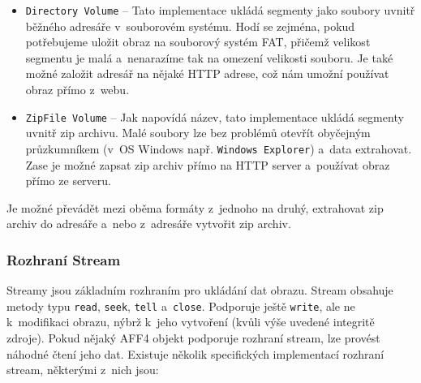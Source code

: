 \begin{itemize}
\item \texttt{Directory Volume} -- Tato implementace ukládá segmenty jako soubory uvnitř běžného adresáře v~souborovém systému. Hodí se zejména, pokud potřebujeme uložit obraz na souborový systém FAT, přičemž velikost segmentu je malá a~nenarazíme tak na omezení velikosti souboru. Je také možné založit adresář na nějaké HTTP adrese, což nám umožní používat obraz přímo z~webu.

\item \texttt{ZipFile Volume} -- Jak napovídá název, tato implementace ukládá segmenty uvnitř zip archivu. Malé soubory lze bez problémů otevřít obyčejným průzkumníkem (v~OS Windows např. \texttt{Windows Explorer}) a~data extrahovat. Zase je možné zapsat zip archiv přímo na HTTP server a~používat obraz přímo ze serveru.
\end{itemize}

\noindent Je možné převádět mezi oběma formáty z~jednoho na druhý, extrahovat zip archiv do adresáře a~nebo z~adresáře vytvořit zip archiv.

\subsubsection{Rozhraní Stream}
Streamy jsou základním rozhraním pro ukládání dat obrazu. Stream obsahuje metody typu \texttt{read}, \texttt{seek}, \texttt{tell} a~\texttt{close}. Podporuje ještě \texttt{write}, ale ne k~modifikaci obrazu, nýbrž k~jeho vytvoření (kvůli výše uvedené integritě zdroje). Pokud nějaký AFF4 objekt podporuje rozhraní stream, lze provést náhodné čtení jeho dat. Existuje několik specifických implementací rozhraní stream, některými z~nich jsou:

